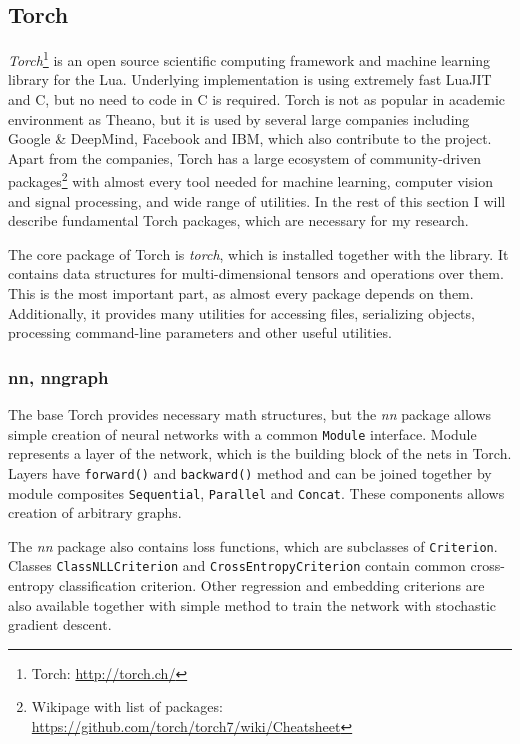 \subsection{Torch}

\emph{Torch}\footnote{Torch: \url{http://torch.ch/}} is an open source scientific computing framework and machine learning library for the Lua. Underlying implementation is using extremely fast LuaJIT and C, but no need to code in C is required. Torch is not as popular in academic environment as Theano, but it is used by several large companies including Google \& DeepMind, Facebook and IBM, which also contribute to the project. Apart from the companies, Torch has a large ecosystem of community-driven packages\footnote{Wikipage with list of packages: \url{https://github.com/torch/torch7/wiki/Cheatsheet}} with almost every tool needed for machine learning, computer vision and signal processing, and wide range of utilities. In the rest of this section I will describe fundamental Torch packages, which are necessary for my research.

The core package of Torch is \emph{torch}, which is installed together with the library. It contains data structures for multi-dimensional tensors and operations over them. This is the most important part, as almost every package depends on them. Additionally, it provides many utilities for accessing files, serializing objects, processing command-line parameters and other useful utilities.

\subsubsection{nn, nngraph}

The base Torch provides necessary math structures, but the \emph{nn} package allows simple creation of neural networks with a common \texttt{Module} interface. Module represents a layer of the network, which is the building block of the nets in Torch. Layers have \texttt{forward()} and \texttt{backward()} method and can be joined together by module composites \texttt{Sequential}, \texttt{Parallel} and \texttt{Concat}. These components allows creation of arbitrary graphs.

The \emph{nn} package also contains loss functions, which are subclasses of \texttt{Criterion}. Classes \texttt{ClassNLLCriterion} and \texttt{CrossEntropyCriterion} contain common cross-entropy classification criterion. Other regression and embedding criterions are also available together with simple method to train the network with stochastic gradient descent.

